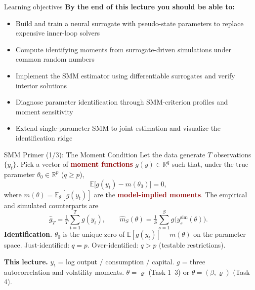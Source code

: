 \documentclass[10pt,aspectratio=169]{beamer}
\newcommand{\emphc}[1]{\textbf{\textcolor{darkred}{#1}}}
\begin{document}
\begin{frame}{Learning objectives}
\textbf{By the end of this lecture you should be able to:}
\begin{itemize}
  \item Build and train a neural surrogate with pseudo-state parameters to replace expensive inner-loop solvers
  \item Compute identifying moments from surrogate-driven simulations under common random numbers
  \item Implement the SMM estimator using differentiable surrogates and verify interior solutions
  \item Diagnose parameter identification through SMM-criterion profiles and moment sensitivity
  \item Extend single-parameter SMM to joint estimation and visualize the identification ridge
\end{itemize}
\end{frame}


\begin{frame}{SMM Primer (1/3): The Moment Condition}
\small
Let the data generate $T$ observations $\{y_t\}$. Pick a vector of \emphc{moment functions} $g(y) \in \mathbb{R}^{q}$ such that, under the true parameter $\theta_0 \in \mathbb{R}^{p}$ ($q \geq p$),
\[
    \mathbb{E}\bigl[g(y_t) - m(\theta_0)\bigr] = 0,
\]
where $m(\theta) = \mathbb{E}_\theta[g(y_t)]$ are the \emphc{model-implied moments}. The empirical and simulated counterparts are
\[
    \widehat g_T = \tfrac{1}{T}\sum_{t=1}^{T} g(y_t), \qquad
    \widehat m_S(\theta) = \tfrac{1}{S}\sum_{s=1}^{S} g\bigl(y_s^{\text{sim}}(\theta)\bigr).
\]
\textbf{Identification.} $\theta_0$ is the unique zero of $\mathbb{E}[g(y_t)] - m(\theta)$ on the parameter space. Just-identified: $q = p$. Over-identified: $q > p$ (testable restrictions).

\vspace{0.2em}
\textbf{This lecture.} $y_t$ = log output / consumption / capital. $g$ = three autocorrelation and volatility moments. $\theta = \varrho$ (Task 1--3) or $\theta = (\beta, \varrho)$ (Task 4).
\end{frame}
\end{document}
